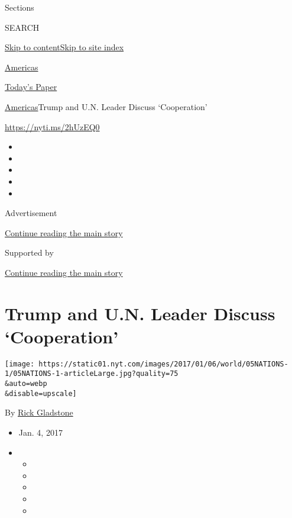 Sections

SEARCH

\protect\hyperlink{site-content}{Skip to
content}\protect\hyperlink{site-index}{Skip to site index}

\href{https://www.nytimes.com/section/world/americas}{Americas}

\href{https://myaccount.nytimes.com/auth/login?response_type=cookie\&client_id=vi}{}

\href{https://www.nytimes.com/section/todayspaper}{Today's Paper}

\href{/section/world/americas}{Americas}\textbar{}Trump and U.N. Leader
Discuss `Cooperation'

\url{https://nyti.ms/2hUzEQ0}

\begin{itemize}
\item
\item
\item
\item
\item
\end{itemize}

Advertisement

\protect\hyperlink{after-top}{Continue reading the main story}

Supported by

\protect\hyperlink{after-sponsor}{Continue reading the main story}

\hypertarget{trump-and-un-leader-discuss-cooperation}{%
\section{Trump and U.N. Leader Discuss
`Cooperation'}\label{trump-and-un-leader-discuss-cooperation}}

\texttt{[image: https://static01.nyt.com/images/2017/01/06/world/05NATIONS-1/05NATIONS-1-articleLarge.jpg?quality=75\\\&auto=webp\\\&disable=upscale]}

By \href{https://www.nytimes.com/by/rick-gladstone}{Rick Gladstone}

\begin{itemize}
\item
  Jan. 4, 2017
\item
  \begin{itemize}
  \item
  \item
  \item
  \item
  \item
  \end{itemize}
\end{itemize}


